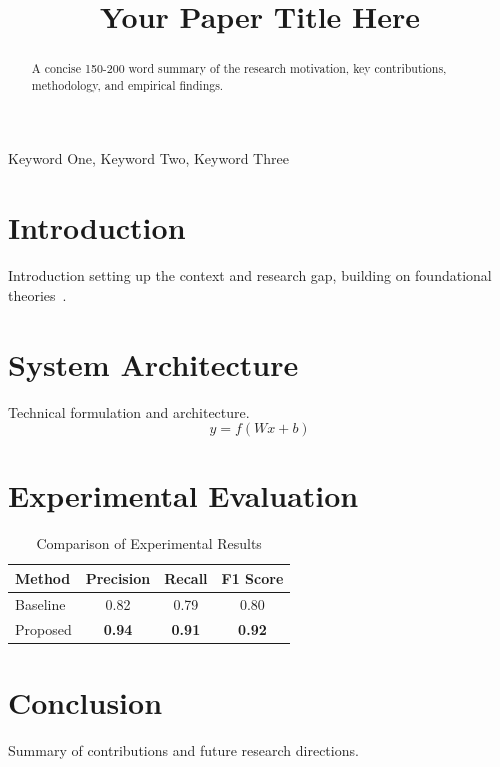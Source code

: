 \documentclass[conference]{IEEEtran}
\begin{document}
\title{Your Paper Title Here}

\author{
\and
{}
}

\maketitle

\begin{abstract}
A concise 150-200 word summary of the research motivation, key contributions, methodology, and empirical findings.
\end{abstract}

\begin{IEEEkeywords}
Keyword One, Keyword Two, Keyword Three
\end{IEEEkeywords}

\section{Introduction}
Introduction setting up the context and research gap, building on foundational theories~\cite{sample}.

\section{System Architecture}
Technical formulation and architecture.
\begin{equation}
y = f(Wx + b)
\end{equation}

\section{Experimental Evaluation}
\begin{table}[htbp]
\centering
\caption{Comparison of Experimental Results}
\label{tab:results}
\begin{tabular}{lccc}
\toprule
\textbf{Method} & \textbf{Precision} & \textbf{Recall} & \textbf{F1 Score} \\
\midrule
Baseline & 0.82 & 0.79 & 0.80 \\
Proposed & \textbf{0.94} & \textbf{0.91} & \textbf{0.92} \\
\bottomrule
\end{tabular}
\end{table}

\section{Conclusion}
Summary of contributions and future research directions.



\end{document}

